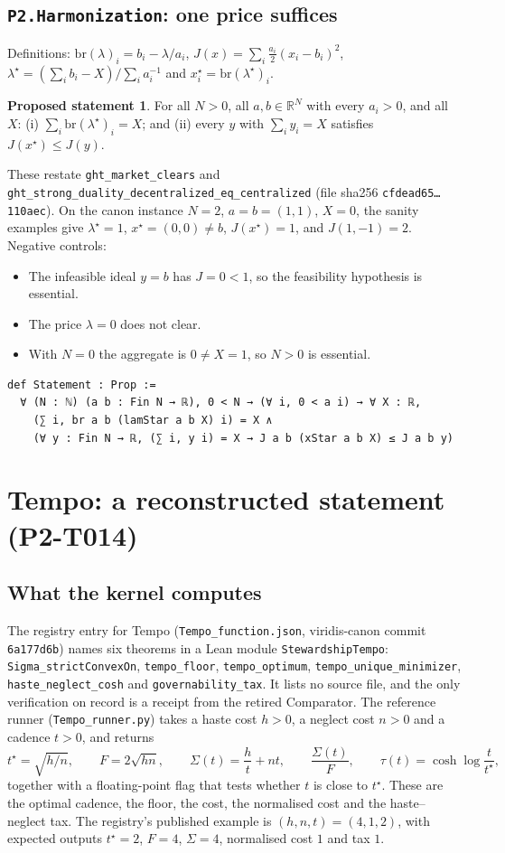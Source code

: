 \documentclass[11pt]{article}
\theoremstyle{definition}
\newtheorem{proposal}[theorem]{Proposed statement}
\theoremstyle{remark}
\begin{document}
\subsection{\texttt{P2.Harmonization}: one price suffices}
Definitions: $\mathrm{br}(\lambda)_i=b_i-\lambda/a_i$, $J(x)=\sum_i \tfrac{a_i}{2}(x_i-b_i)^2$,
$\lambda^\star=(\sum_i b_i-X)/\sum_i a_i^{-1}$ and $x^\star_i=\mathrm{br}(\lambda^\star)_i$.
\begin{proposal}
For all $N>0$, all $a,b\in\mathbb{R}^N$ with every $a_i>0$, and all $X$:
(i) $\sum_i \mathrm{br}(\lambda^\star)_i=X$; and
(ii) every $y$ with $\sum_i y_i=X$ satisfies $J(x^\star)\le J(y)$.
\end{proposal}
These restate \texttt{ght\_market\_clears} and \texttt{ght\_strong\_duality\_decentralized\_eq\_centralized}
(file sha256 \texttt{cfdead65\ldots 110aec}).
On the canon instance $N=2$, $a=b=(1,1)$, $X=0$, the sanity examples give $\lambda^\star=1$, $x^\star=(0,0)\ne b$, $J(x^\star)=1$, and $J(1,-1)=2$.
Negative controls:
\begin{itemize}
\item The infeasible ideal $y=b$ has $J=0<1$, so the feasibility hypothesis is essential.
\item The price $\lambda=0$ does not clear.
\item With $N=0$ the aggregate is $0\ne X=1$, so $N>0$ is essential.
\end{itemize}
\begin{lstlisting}
def Statement : Prop :=
  ∀ (N : ℕ) (a b : Fin N → ℝ), 0 < N → (∀ i, 0 < a i) → ∀ X : ℝ,
    (∑ i, br a b (lamStar a b X) i) = X ∧
    (∀ y : Fin N → ℝ, (∑ i, y i) = X → J a b (xStar a b X) ≤ J a b y)
\end{lstlisting}

\section{Tempo: a reconstructed statement (P2-T014)}\label{sec:tempo}
\subsection{What the kernel computes}
The registry entry for Tempo (\texttt{Tempo\_function.json}, viridis-canon commit \texttt{6a177d6b}) names six theorems in a
Lean module \texttt{StewardshipTempo}:
\texttt{Sigma\_strictConvexOn}, \texttt{tempo\_floor}, \texttt{tempo\_optimum}, \texttt{tempo\_unique\_minimizer},
\texttt{haste\_neglect\_cosh} and \texttt{governability\_tax}.
It lists no source file, and the only verification on record is a receipt from the retired Comparator.
The reference runner (\texttt{Tempo\_runner.py}) takes a haste cost $h>0$, a neglect cost $n>0$ and a cadence $t>0$, and returns
\[
t^\star=\sqrt{h/n},\qquad F=2\sqrt{hn},\qquad \Sigma(t)=\frac{h}{t}+nt,\qquad \frac{\Sigma(t)}{F},\qquad
\tau(t)=\cosh\log\frac{t}{t^\star},
\]
together with a floating-point flag that tests whether $t$ is close to $t^\star$.
These are the optimal cadence, the floor, the cost, the normalised cost and the haste--neglect tax.
The registry's published example is $(h,n,t)=(4,1,2)$, with expected outputs $t^\star=2$, $F=4$, $\Sigma=4$, normalised cost $1$ and tax $1$.
\end{document}
